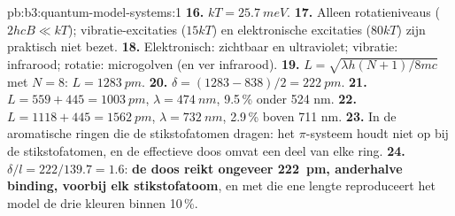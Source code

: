 \begin{solution}{pb:b3:quantum-model-systems:1}
\textbf{16.} $kT = \qty{25.7}{meV}$.
\textbf{17.} Alleen rotatieniveaus ($2hcB \ll kT$); vibratie-excitaties
($15kT$) en elektronische excitaties ($80kT$) zijn praktisch niet bezet.
\textbf{18.} Elektronisch: zichtbaar en ultraviolet; vibratie: infrarood;
rotatie: microgolven (en ver infrarood).
\textbf{19.} $L = \sqrt{\lambda h(N+1)/8mc}$ met $N = 8$: $L = \qty{1283}{pm}$.
\textbf{20.} $\delta = (1283 - 838)/2 = \qty{222}{pm}$.
\textbf{21.} $L = 559 + 445 = \qty{1003}{pm}$, $\lambda = \qty{474}{nm}$, 9.5\,\%
onder 524 nm.
\textbf{22.} $L = 1118 + 445 = \qty{1562}{pm}$, $\lambda = \qty{732}{nm}$, 2.9\,\%
boven 711 nm.
\textbf{23.} In de aromatische ringen die de stikstofatomen dragen: het
$\pi$-systeem houdt niet op bij de stikstofatomen, en de effectieve doos
omvat een deel van elke ring.
\textbf{24.} $\delta/l = 222/139.7 = 1.6$: \textbf{de doos reikt ongeveer
\qty{222}{pm}, anderhalve binding, voorbij elk stikstofatoom}, en met die ene
lengte reproduceert het model de drie kleuren binnen 10\,\%.
\end{solution}
